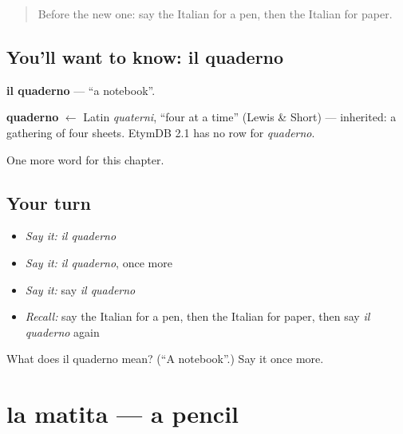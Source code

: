 \label{lesson:IT-C61-quaderno}



\begin{quote}
Before the new one: say the Italian for a pen, then the Italian for paper.
\end{quote}

\subsection*{You'll want to know: il quaderno}
\textbf{il quaderno} — \textquotedblleft{}a notebook\textquotedblright{}.

\begin{cousinweb}
\textbf{quaderno} $\leftarrow$ Latin \emph{quaterni}, \textquotedblleft{}four at a time\textquotedblright{} (Lewis \& Short) — inherited: a gathering of four sheets. EtymDB 2.1 has no row for \emph{quaderno}.
\end{cousinweb}

\begin{grammarlens}[title={What you've built}]
One more word for this chapter.
\end{grammarlens}

\subsection*{Your turn}
\begin{itemize}
\raggedright
  \item \emph{Say it:} \emph{il quaderno}
  \item \emph{Say it:} \emph{il quaderno}, once more
  \item \emph{Say it:} say \emph{il quaderno}
  \item \emph{Recall:} say the Italian for a pen, then the Italian for paper, then say \emph{il quaderno} again
\end{itemize}

\begin{tcolorbox}[breakable,colback=teal!4,colframe=teal!35!black,title={Before you move on}]
What does il quaderno mean? (\textquotedblleft{}A notebook\textquotedblright{}.) Say it once more.
\end{tcolorbox}
\section[la matita]{la matita — a pencil}

\label{lesson:IT-C61-matita}



